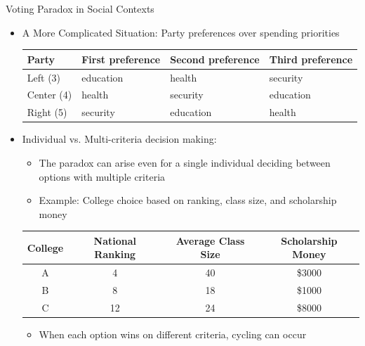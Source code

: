 \documentclass[10pt,handout]{beamer}
\begin{document}
\begin{frame}{Voting Paradox in Social Contexts}
  \begin{itemize}
    \item A More Complicated Situation: Party preferences over spending priorities
      \begin{table}
        \center
        \begin{tabular}{llll}
          \toprule
          \textbf{Party} & \textbf{First preference} & \textbf{Second preference} & \textbf{Third preference} \\
          \midrule
          Left (3)   & education & health & security \\
          Center (4) & health & security & education \\
          Right (5)  & security & education & health \\
          \bottomrule
        \end{tabular}
      \end{table}
    \item Individual vs. Multi-criteria decision making:
      \begin{itemize}
        \item The paradox can arise even for a single individual deciding between options with multiple criteria
        \item Example: College choice based on ranking, class size, and scholarship money
      \end{itemize}
      \begin{table}
        \center
        \begin{tabular}{cccc}
          \toprule
          \textbf{College} & \textbf{National Ranking} & \textbf{Average Class Size} & \textbf{Scholarship Money} \\
          \midrule
          A & 4 & 40 & \$3000 \\
          B & 8 & 18 & \$1000 \\
          C & 12 & 24 & \$8000 \\
          \bottomrule
        \end{tabular}
      \end{table}
      \begin{itemize}
        \item When each option wins on different criteria, cycling can occur
      \end{itemize}
  \end{itemize}
\end{frame}
\end{document}
